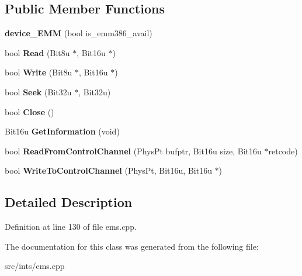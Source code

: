 \subsection*{Public Member Functions}
\begin{DoxyCompactItemize}
\item 
\hypertarget{classdevice__EMM_abe0c07b3c8989251c2c86b710ab83217}{{\bfseries device\-\_\-\-E\-M\-M} (bool is\-\_\-emm386\-\_\-avail)}\label{classdevice__EMM_abe0c07b3c8989251c2c86b710ab83217}

\item 
\hypertarget{classdevice__EMM_a6c62e1a0b8556bf0421d2c4de6eb0e25}{bool {\bfseries Read} (Bit8u $\ast$, Bit16u $\ast$)}\label{classdevice__EMM_a6c62e1a0b8556bf0421d2c4de6eb0e25}

\item 
\hypertarget{classdevice__EMM_adfd5b12355f2d989045fab9fa5e9acc4}{bool {\bfseries Write} (Bit8u $\ast$, Bit16u $\ast$)}\label{classdevice__EMM_adfd5b12355f2d989045fab9fa5e9acc4}

\item 
\hypertarget{classdevice__EMM_adb3ac540c49174fb7fcc58dcd0d8d91e}{bool {\bfseries Seek} (Bit32u $\ast$, Bit32u)}\label{classdevice__EMM_adb3ac540c49174fb7fcc58dcd0d8d91e}

\item 
\hypertarget{classdevice__EMM_a86c23d668635587cda864ce3d6def05d}{bool {\bfseries Close} ()}\label{classdevice__EMM_a86c23d668635587cda864ce3d6def05d}

\item 
\hypertarget{classdevice__EMM_a08750d12358cc26010295c24066caaac}{Bit16u {\bfseries Get\-Information} (void)}\label{classdevice__EMM_a08750d12358cc26010295c24066caaac}

\item 
\hypertarget{classdevice__EMM_ae6da9c47ea49efe899b779f6ccff23d9}{bool {\bfseries Read\-From\-Control\-Channel} (Phys\-Pt bufptr, Bit16u size, Bit16u $\ast$retcode)}\label{classdevice__EMM_ae6da9c47ea49efe899b779f6ccff23d9}

\item 
\hypertarget{classdevice__EMM_a08952bf66d9a65a44dd399dac20e3895}{bool {\bfseries Write\-To\-Control\-Channel} (Phys\-Pt, Bit16u, Bit16u $\ast$)}\label{classdevice__EMM_a08952bf66d9a65a44dd399dac20e3895}

\end{DoxyCompactItemize}


\subsection{Detailed Description}


Definition at line 130 of file ems.\-cpp.



The documentation for this class was generated from the following file\-:\begin{DoxyCompactItemize}
\item 
src/ints/ems.\-cpp\end{DoxyCompactItemize}
